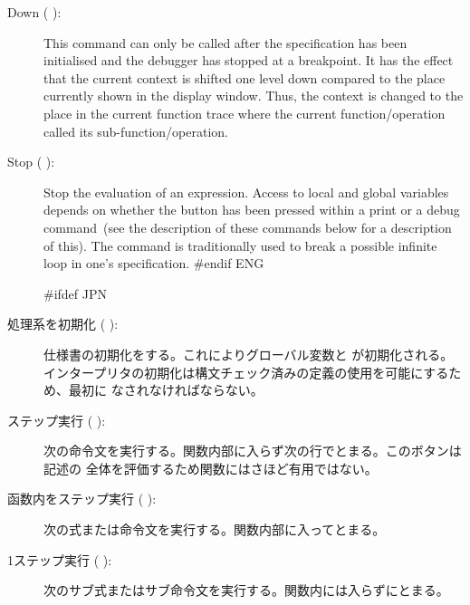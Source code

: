 \documentclass[\pformat,12pt]{article}
\newcommand{\guicmd}[1]{{\sf #1}}
\newcommand{\guicmd}[1]{{\gt #1}}
\begin{document}
\begin{description}
\item[\guicmd{Down} (\hspace{-1.8mm}
):]
This command can only be called after the specification has been
initialised and the debugger has stopped at a breakpoint. It has the
effect that the current context is shifted one level down compared to
the place currently shown in the display window. Thus, the context is
changed to the place in the current function trace where the current
function/operation called its sub-function/operation.

\item[\guicmd{Stop} (\hspace{-1.8mm}
):] 
Stop the evaluation of an
  expression. Access to local and global variables depends on whether
  the button has been pressed within a \guicmd{print} or a
  \guicmd{debug} command~(see the description of these commands below
  for a description of this). The command is traditionally
  used to break a possible infinite loop in one's specification.
#endif ENG

#ifdef JPN
\item[\guicmd{処理系を初期化} (\hspace{-1.8mm}
):]
仕様書の初期化をする。これによりグローバル変数と
 が初期化される。
インタープリタの初期化は構文チェック済みの定義の使用を可能にするため、最初に
なされなければならない。

\item[\guicmd{ステップ実行} (\hspace{-1.8mm}
):] 
  次の命令文を実行する。関数内部に入らず次の行でとまる。このボタンは記述の
  全体を評価するため関数にはさほど有用ではない。

\item[\guicmd{函数内をステップ実行} (\hspace{-1.8mm}
):] 
  次の式または命令文を実行する。関数内部に入ってとまる。
  
\item[\guicmd{1ステップ実行} (\hspace{-1.8mm}
):] 
  次のサブ式またはサブ命令文を実行する。関数内には入らずにとまる。


\end{description}
\end{document}

